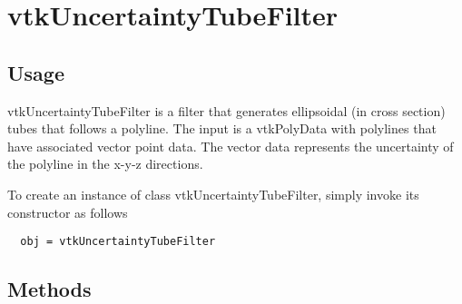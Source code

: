 \section{vtkUncertaintyTubeFilter}

\subsection{Usage}

 vtkUncertaintyTubeFilter is a filter that generates ellipsoidal (in cross
 section) tubes that follows a polyline. The input is a vtkPolyData with
 polylines that have associated vector point data. The vector data represents
 the uncertainty of the polyline in the x-y-z directions.


To create an instance of class vtkUncertaintyTubeFilter, simply
invoke its constructor as follows
\begin{verbatim}
  obj = vtkUncertaintyTubeFilter
\end{verbatim}
\subsection{Methods}

